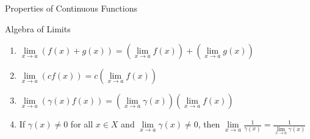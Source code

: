 \documentclass{article}
\begin{document}
\begin{multicols*}{3}
\begin{blackbox}{Properties of Continuous Functions}
\begin{brownbox}{Algebra of Limits}
    \begin{enumerate}[label=(\roman*)]
        \item $\lim\limits_{x\rightarrow a} (f(x) + g(x)) = \left(\lim\limits_{x\rightarrow a} f(x)\right) + \left(\lim\limits_{x\rightarrow a} g(x)\right)$
        \item $\lim\limits_{x \rightarrow a} (cf(x)) = c \left(\lim\limits_{x\rightarrow a} f(x)\right)$
        \item $\lim\limits_{x\rightarrow a} (\gamma(x)f(x)) = \left(\lim\limits_{x\rightarrow a}\gamma(x)\right)\left(\lim\limits_{x\rightarrow a} f(x)\right)$
        \item If $\gamma(x) \neq 0$ for all $x \in X$ and $\lim\limits_{x\rightarrow a} \gamma(x) \neq 0$, then  $\lim\limits_{x\rightarrow a}\frac{1}{\gamma(x)} = \frac{1}{\lim\limits_{x\rightarrow a}\gamma(x)}$
    \end{enumerate}
        

\end{brownbox}
\end{blackbox}
\end{multicols*}
\end{document}

